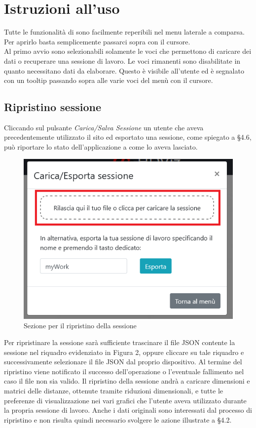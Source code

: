 \section{Istruzioni all'uso}
Tutte le funzionalità di \NomeProgetto{} sono facilmente reperibili nel menu laterale a comparsa. Per aprirlo basta semplicemente passarci sopra con il cursore.\\
Al primo avvio sono selezionabili solamente le voci che permettono di caricare dei dati o recuperare una sessione di lavoro. Le voci rimanenti sono disabilitate in quanto necessitano dati da elaborare. Questo è visibile all'utente ed è segnalato con un tooltip passando sopra alle varie voci del menù con il cursore.

\subsection{Ripristino sessione}

Cliccando sul pulsante \textit{Carica/Salva Sessione} un utente che aveva precedentemente utilizzato il sito ed esportato una sessione, come spiegato a \S 4.6, può riportare lo stato dell'applicazione a come lo aveva lasciato.
\begin{figure}[H]
		\includegraphics[scale=0.7]{Images/CaricaSessione.png}
		\centering
		\caption{Sezione per il ripristino della sessione}
\end{figure}

Per ripristinare la sessione sarà sufficiente trascinare il file JSON contente la sessione nel riquadro evidenziato in Figura 2, oppure cliccare su tale riquadro e successivamente selezionare il file JSON dal proprio dispositivo. Al termine del ripristino viene notificato il successo dell'operazione o l'eventuale fallimento nel caso il file non sia valido.
Il ripristino della sessione andrà a caricare dimensioni e matrici delle distanze, ottenute tramite riduzioni dimensionali, e tutte le preferenze di visualizzazione nei vari grafici che l'utente aveva utilizzato durante la propria sessione di lavoro. Anche i dati originali sono interessati dal processo di ripristino e non risulta quindi necessario svolgere le azione illustrate a \S 4.2. 

